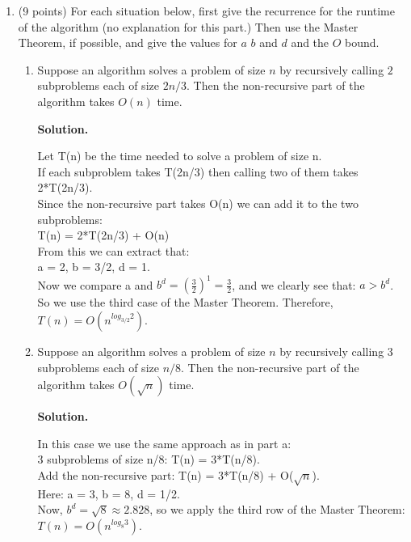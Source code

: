\documentclass[10pt,letterpaper,unboxed,cm]{article}
\newenvironment{solution}
  {\par\medskip\noindent\textbf{Solution.}\ }
  {\par\medskip}
\begin{document}
\begin{enumerate}
\begin{enumerate}[(a.)]
\end{enumerate}



\item
(9 points) For each situation below, first give the recurrence for the runtime of the algorithm (no explanation for this part.) Then use the Master Theorem, if possible, and give the values for $a$ $b$ and $d$ and the $O$ bound.

\begin{enumerate}
\item
Suppose an algorithm solves a problem of size $n$ by recursively calling $2$ subproblems each of size $2n/3$. Then the non-recursive part of the algorithm takes $O(n)$ time.

\begin{solution}

	Let T(n) be the time needed to solve a problem of size n.\\
	If each subproblem takes T(2n/3) then calling two of them takes 2*T(2n/3).\\
	Since the non-recursive part takes O(n) we can add it to the two subproblems:\\
	T(n) = 2*T(2n/3) + O(n)\\
	From this we can extract that:\\
	a = 2, b = 3/2, d = 1.\\
	Now we compare a and $b^d = (\frac{3}{2})^1 = \frac{3}{2}$, and we clearly see that: $a > b^d$.\\
	So we use the third case of the Master Theorem. Therefore, $\boxed{T(n) = O(n^{log_{3/2}2})}$.\\

\end{solution}

\item
Suppose an algorithm solves a problem of size $n$ by recursively calling $3$ subproblems each of size $n/8$. Then the non-recursive part of the algorithm takes $O(\sqrt{n})$ time.

\begin{solution}

	In this case we use the same approach as in part a:\\
	3 subproblems of size n/8: T(n) = 3*T(n/8).\\
	Add the non-recursive part: T(n) = 3*T(n/8) + O($\sqrt{n}$).\\
	Here: a = 3, b = 8, d = 1/2.\\
	Now, $b^d = \sqrt{8} \approx 2.828$, so we apply the third row of the Master Theorem:\\
	$\boxed{T(n) = O(n^{log_8{3}})}$.


\end{solution}
\end{enumerate}
\end{enumerate}
\end{document}
